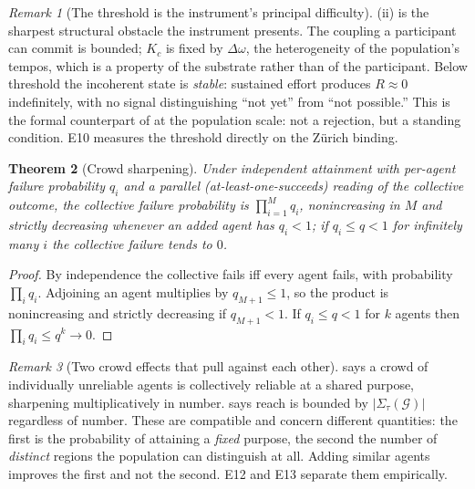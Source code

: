 \documentclass[11pt,a4paper]{article}
\theoremstyle{clstyle}
\newtheorem{theorem}{Theorem}[section]
\theoremstyle{definition}
\theoremstyle{remark}
\newtheorem{remark}[theorem]{Remark}
\newcommand{\Gph}{\mathcal{G}}
\newcommand{\Sig}{\Sigma}
\newcommand{\Ord}{R}
\newcommand{\Kc}{K_{c}}
\newcommand{\abs}[1]{\lvert#1\rvert}
\begin{document}
\begin{remark}[The threshold is the instrument's principal difficulty]
\label{rem:threshold}
(ii) is the sharpest structural obstacle the instrument
presents. The coupling a participant can commit is bounded; $\Kc$ is fixed by
$\Delta\omega$, the heterogeneity of the population's tempos, which is a
property of the substrate rather than of the participant. Below threshold the
incoherent state is \emph{stable}: sustained effort produces $\Ord\approx0$
indefinitely, with no signal distinguishing ``not yet'' from ``not
possible.'' This is the formal counterpart of  at the
population scale: not a rejection, but a standing condition. E10 measures the
threshold directly on the Z{\"u}rich binding.
\end{remark}

\begin{theorem}[Crowd sharpening]
\label{thm:crowd}
Under independent attainment with per-agent failure probability $q_i$ and a
parallel (at-least-one-succeeds) reading of the collective outcome, the
collective failure probability is $\prod_{i=1}^{M}q_i$, nonincreasing in $M$
and strictly decreasing whenever an added agent has $q_i<1$; if $q_i\le q<1$
for infinitely many $i$ the collective failure tends to $0$.
\end{theorem}

\begin{proof}
By independence the collective fails iff every agent fails, with probability
$\prod_i q_i$. Adjoining an agent multiplies by $q_{M+1}\le1$, so the product
is nonincreasing and strictly decreasing if $q_{M+1}<1$. If $q_i\le q<1$ for
$k$ agents then $\prod_i q_i\le q^{k}\to0$.
\end{proof}

\begin{remark}[Two crowd effects that pull against each other]
\label{rem:two-crowd}
 says a crowd of individually unreliable agents is
collectively reliable at a shared purpose, sharpening multiplicatively in
number.  says reach is bounded by
$\abs{\Sig_\tau(\Gph)}$ regardless of number. These are compatible and
concern different quantities: the first is the probability of attaining a
\emph{fixed} purpose, the second the number of \emph{distinct} regions the
population can distinguish at all. Adding similar agents improves the first
and not the second. E12 and E13 separate them empirically.
\end{remark}
\end{document}
